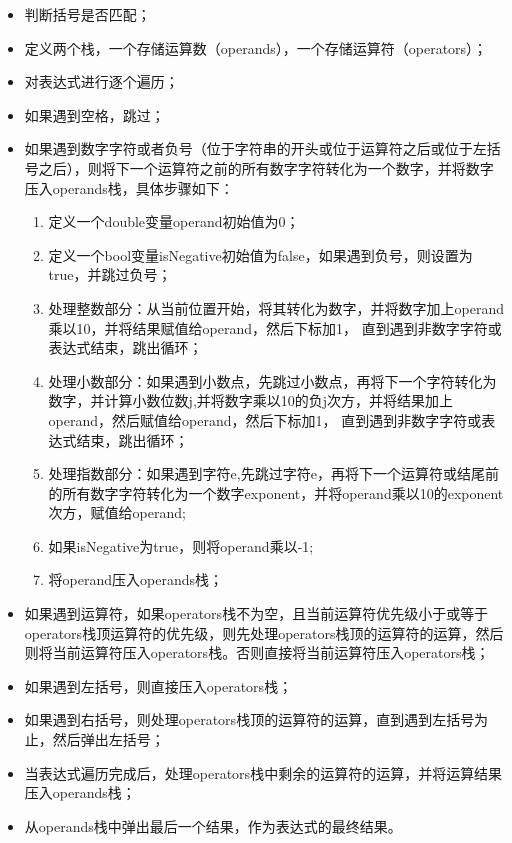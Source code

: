\documentclass[UTF8]{ctexart}
\begin{document}
\begin{itemize}
    \item 判断括号是否匹配；
    \item 定义两个栈，一个存储运算数（operands），一个存储运算符（operators）；
    \item 对表达式进行逐个遍历；
    \item 如果遇到空格，跳过；
    \item 如果遇到数字字符或者负号（位于字符串的开头或位于运算符之后或位于左括号之后），则将下一个运算符之前的所有数字字符转化为一个数字，并将数字压入operands栈，具体步骤如下：
       
        \begin{enumerate}
            \item 定义一个double变量operand初始值为0；
            \item 定义一个bool变量isNegative初始值为false，如果遇到负号，则设置为true，并跳过负号；
            \item 处理整数部分：从当前位置开始，将其转化为数字，并将数字加上operand乘以10，并将结果赋值给operand，然后下标加1，
            直到遇到非数字字符或表达式结束，跳出循环；
            \item 处理小数部分：如果遇到小数点，先跳过小数点，再将下一个字符转化为数字，并计算小数位数j,并将数字乘以10的负j次方，并将结果加上operand，然后赋值给operand，然后下标加1，
            直到遇到非数字字符或表达式结束，跳出循环；
            \item 处理指数部分：如果遇到字符e,先跳过字符e，再将下一个运算符或结尾前的所有数字字符转化为一个数字exponent，并将operand乘以10的exponent次方，赋值给operand;
            \item 如果isNegative为true，则将operand乘以-1;
            \item 将operand压入operands栈；
        \end{enumerate}

    \item 如果遇到运算符，如果operators栈不为空，且当前运算符优先级小于或等于operators栈顶运算符的优先级，则先处理operators栈顶的运算符的运算，然后则将当前运算符压入operators栈。否则直接将当前运算符压入operators栈；
    \item 如果遇到左括号，则直接压入operators栈；
    \item 如果遇到右括号，则处理operators栈顶的运算符的运算，直到遇到左括号为止，然后弹出左括号；
    \item 当表达式遍历完成后，处理operators栈中剩余的运算符的运算，并将运算结果压入operands栈；
    \item 从operands栈中弹出最后一个结果，作为表达式的最终结果。

\end{itemize}
\end{document}
